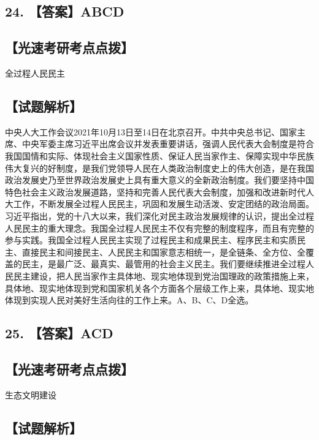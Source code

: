 \documentclass[UTF8,11pt]{ctexart}
\begin{document}
\subsection*{24. 【答案】ABCD}

\subsection*{【光速考研考点点拨】}

全过程人民民主


\subsection*{【试题解析】}

中央人大工作会议2021年10月13日至14日在北京召开。中共中央总书记、国家主席、中央军委主席习近平出席会议并发表重要讲话，强调人民代表大会制度是符合我国国情和实际、体现社会主义国家性质、保证人民当家作主、保障实现中华民族伟大复兴的好制度，是我们党领导人民在人类政治制度史上的伟大创造，是在我国政治发展史乃至世界政治发展史上具有重大意义的全新政治制度。我们要坚持中国特色社会主义政治发展道路，坚持和完善人民代表大会制度，加强和改进新时代人大工作，不断发展全过程人民民主，巩固和发展生动活泼、安定团结的政治局面。习近平指出，党的十八大以来，我们深化对民主政治发展规律的认识，提出全过程人民民主的重大理念。我国全过程人民民主不仅有完整的制度程序，而且有完整的参与实践。我国全过程人民民主实现了过程民主和成果民主、程序民主和实质民主、直接民主和间接民主、人民民主和国家意志相统一，是全链条、全方位、全覆盖的民主，是最广泛、最真实、最管用的社会主义民主。我们要继续推进全过程人民民主建设，把人民当家作主具体地、现实地体现到党治国理政的政策措施上来，具体地、现实地体现到党和国家机关各个方面各个层级工作上来，具体地、现实地体现到实现人民对美好生活向往的工作上来。A、B、C、D全选。


\subsection*{25. 【答案】ACD}

\subsection*{【光速考研考点点拨】}

生态文明建设


\subsection*{【试题解析】}
\end{document}
